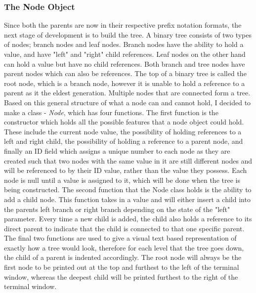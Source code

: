 \documentclass[11pt]{article}
\begin{document}
\subsubsection{The Node Object}
Since both the parents are now in their respective prefix notation formats, the next stage of development is to build the tree. A binary tree consists of two types of nodes; branch nodes and leaf nodes. Branch nodes have the ability to hold a value, and have "left" and "right" child references. Leaf nodes on the other hand can hold a value but have no child references. Both branch and tree nodes have parent nodes which can also be references. The top of a binary tree is called the root node, which is a branch node, however it is unable to hold a reference to a parent as it the eldest generation. Multiple nodes that are connected form a tree. \\
Based on this general structure of what a node can and cannot hold, I decided to make a class - \textit{Node}, which has four functions. The first function is the constructor which holds all the possible features that a node object could hold. These include the current node value, the possibility of holding references to a left and right child, the possibility of holding a reference to a parent node, and finally an ID field which assigns a unique number to each node as they are created such that two nodes with the same value in it are still different nodes and will be referenced to by their ID value, rather than the value they possess. Each node is null until a value is assigned to it, which will be done when the tree is being constructed. The second function that the Node class holds is the ability to add a child node. This function takes in a value and will either insert a child into the parents left branch or right branch depending on the state of the "left" parameter. Every time a new child is added, the child also holds a reference to its direct parent to indicate that the child is connected to that one specific parent. \\
The final two functions are used to give a visual text based representation of exactly how a tree would look, therefore for each level that the tree goes down, the child of a parent is indented accordingly. The root node will always be the first node to be printed out at the top and furthest to the left of the terminal window, whereas the deepest child will be printed furthest to the right of the terminal window. 
\end{document}
